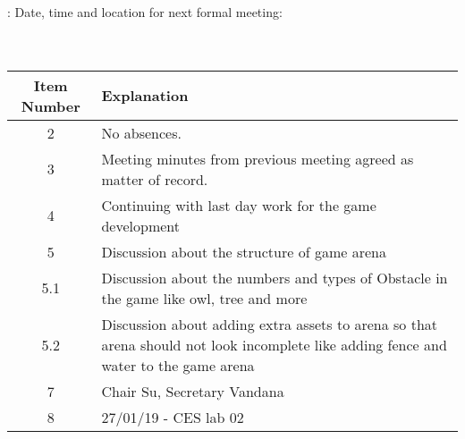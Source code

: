 \documentclass{article}
\begin{document}
: Date, time and location for next formal meeting: \\\\ \indent  \\

\begin{table}[H]
	\centering
	\begin{tabular}{| c | p{9cm} |}
		\hline
		Item Number & Explanation \\ \hline
		2 & No absences.\\ \hline
		3 & Meeting minutes from previous meeting agreed as matter of record. \\ \hline
		4 & Continuing with last day work for the game development  \\ \hline
		5 & Discussion about the structure of game arena \\ \hline
		5.1 & Discussion about the numbers and types of Obstacle in the game like owl, tree and more\\ \hline
		5.2 & Discussion about adding extra assets to arena so that arena should not look incomplete like adding fence and water to the game arena  \\ \hline
		7 & Chair Su, Secretary Vandana \\ \hline
		8 & 27/01/19 - CES lab 02   \\ \hline
		

		
	\end{tabular}
\end{table}
\end{document}
